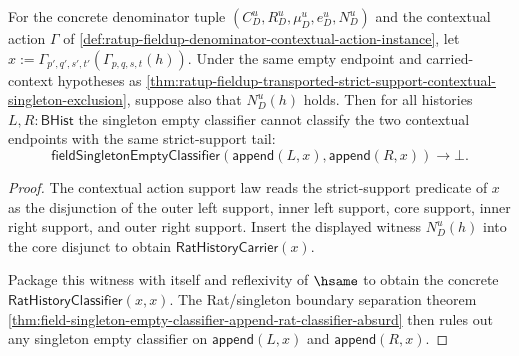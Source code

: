 \begin{theorem}
\label{thm:rat-denom-unit-contextual-action-strict-support-singleton-classifier-exclusion}
For the concrete denominator tuple $(C_D^u,R_D^u,\mu_D^u,e_D^u,N_D^u)$ and the
contextual action $\Gamma$ of
\autoref{def:ratup-fieldup-denominator-contextual-action-instance}, let
$x:=\Gamma_{p',q',s',t'}(\Gamma_{p,q,s,t}(h))$. Under the same empty endpoint
and carried-context hypotheses as
\autoref{thm:ratup-fieldup-transported-strict-support-contextual-singleton-exclusion},
suppose also that $N_D^u(h)$ holds. Then for all histories $L,R:\mathsf{BHist}$
the singleton empty classifier cannot classify the two contextual endpoints
with the same strict-support tail:
$$
\mathsf{fieldSingletonEmptyClassifier}(\mathsf{append}(L,x),\mathsf{append}(R,x))
\to\bot.
$$
\end{theorem}
\begin{proof}
The contextual action support law reads the strict-support predicate of $x$ as
the disjunction of the outer left support, inner left support, core support,
inner right support, and outer right support. Insert the displayed witness
$N_D^u(h)$ into the core disjunct to obtain $\mathsf{RatHistoryCarrier}(x)$.

Package this witness with itself and reflexivity of $\hsame$ to obtain the
concrete $\mathsf{RatHistoryClassifier}(x,x)$. The Rat/singleton boundary
separation theorem
\autoref{thm:field-singleton-empty-classifier-append-rat-classifier-absurd}
then rules out any singleton empty classifier on
$\mathsf{append}(L,x)$ and $\mathsf{append}(R,x)$.
\end{proof}

